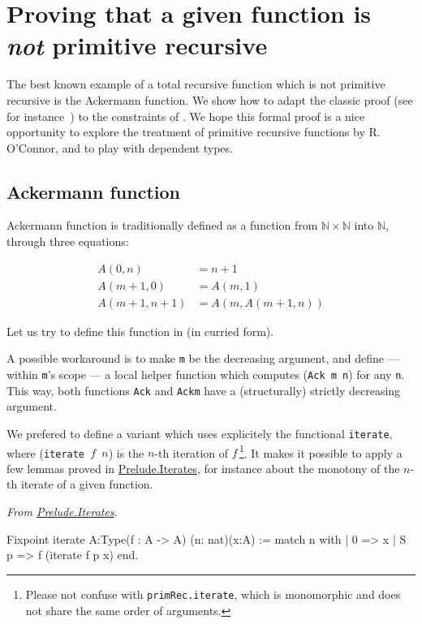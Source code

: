 \section{Proving that a given function is \emph{not} primitive recursive}
\label{sect:ack-not-PR}

The best known example of a total recursive function which is not primitive recursive is the Ackermann function. We show how to adapt the classic proof (see for instance~\cite{planetmath}) to the constraints of \gallina. We hope this formal proof 
 is a nice opportunity to explore
the treatment of primitive recursive functions by R. O'Connor,
and to play with dependent types.

\subsection{Ackermann function}

Ackermann function is traditionally defined as a function from 
$\mathbb{N}\times \mathbb{N}$ into $\mathbb{N}$, through
three equations:

\begin{align}
A(0,n)&=n+1\\
A(m+1,0)&=A(m,1)\\
A(m+1,n+1)&=A(m,A(m+1,n))
\end{align}

Let us try to define this function in \coq{} (in curried form).



A possible workaround is to make \texttt{m} be the 
decreasing argument, and define --- within \texttt{m}'s scope --- a local helper function which computes (\texttt{Ack m n}) for any \texttt{n}.
This way, both functions \texttt{Ack} and \texttt{Ackm} have a (structurally) strictly decreasing argument.



We prefered to define a variant which uses explicitely 
 the functional \texttt{iterate},
where (\texttt{iterate\,$f$\,$n$})
is the $n$-th iteration of $f$\,\footnote{Please not confuse with \texttt{primRec.iterate}, which is monomorphic and does not share the same order of arguments.}. It makes it possible to apply a few lemmas proved in 
\href{../theories/html/hydras.Prelude.Iterates.html}{Prelude.Iterates}, for instance about the monotony of the $n$-th iterate of a given function. 


\vspace{4pt}
\noindent
\emph{From \href{../theories/html/hydras.Prelude.Iterates.html}{Prelude.Iterates}}.
\begin{Coqsrc}
Fixpoint iterate {A:Type}(f : A -> A) (n: nat)(x:A) :=
  match n with
  | 0 => x
  | S p => f (iterate  f p x)
  end.
\end{Coqsrc}


